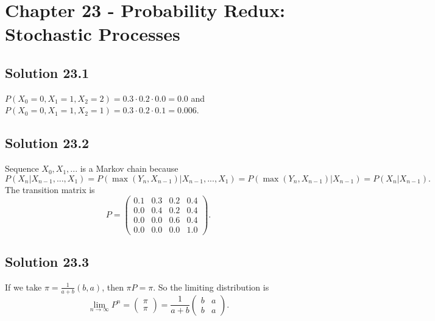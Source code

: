 \section*{Chapter 23 - Probability Redux: Stochastic Processes}

\subsection*{Solution 23.1}

$P(X_0 = 0, X_1 = 1, X_2 = 2) = 0.3 \cdot 0.2 \cdot 0.0 = 0.0$ and $P(X_0 = 0, X_1 = 1, X_2 = 1) = 0.3 \cdot 0.2 \cdot 0.1 = 0.006$.


\subsection*{Solution 23.2}

Sequence $X_0, X_1, ...$ is a Markov chain because
\begin{equation*}
    P(X_n | X_{n - 1}, ..., X_1) = P(\max(Y_n, X_{n - 1}) | X_{n - 1}, ..., X_1)
        = P(\max(Y_n, X_{n - 1}) | X_{n - 1})
        = P(X_n | X_{n - 1}).
\end{equation*}
The transition matrix is
\begin{equation*}
    P = \begin{pmatrix}
        0.1 & 0.3 & 0.2 & 0.4 \\
        0.0 & 0.4 & 0.2 & 0.4 \\
        0.0 & 0.0 & 0.6 & 0.4 \\
        0.0 & 0.0 & 0.0 & 1.0
    \end{pmatrix}.
\end{equation*}


\subsection*{Solution 23.3}

If we take $\pi = \frac{1}{a + b}(b, a)$, then $\pi P = \pi$.
So the limiting distribution is
\begin{equation*}
    \lim_{n \to \infty} P^n = \begin{pmatrix} \pi \\ \pi \end{pmatrix}
        = \frac{1}{a + b} \begin{pmatrix}
            b & a \\
            b & a
        \end{pmatrix}.
\end{equation*}


